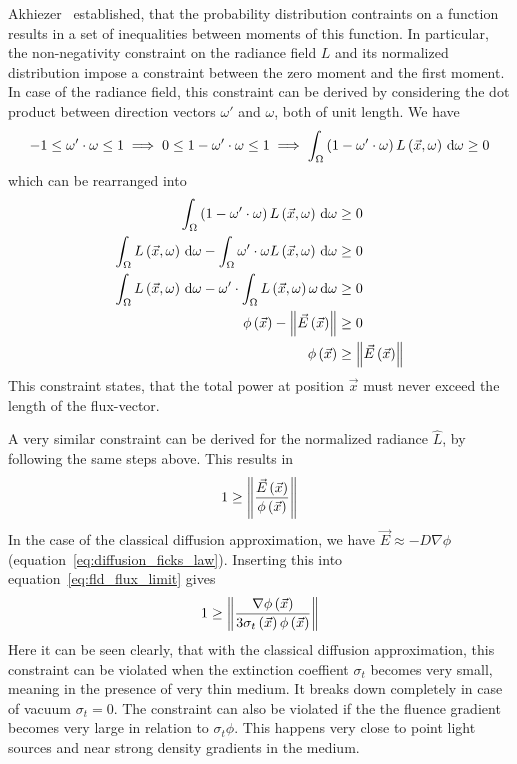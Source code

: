 Akhiezer~\cite{Akhiezer65} established, that the probability distribution contraints on a function results in a set of inequalities between moments of this function. In particular, the non-negativity constraint on the radiance field $L$ and its normalized distribution impose a constraint between the zero moment and the first moment. In case of the radiance field, this constraint can be derived by considering the dot product between direction vectors $\omega'$ and $\omega$, both of unit length. We have
\begin{align*}
-1 \le \omega'\cdot\omega \le 1
\implies
0 \le 1 - \omega'\cdot\omega \le 1
\implies
\int_{\Omega}{\left(1-\omega'\cdot\omega\right)L\left(\vec{x}, \omega\right)\,\mathrm{d}\omega}\ge 0
\end{align*}
which can be rearranged into
\begin{align*}
\int_{\Omega}{\left(1-\omega'\cdot\omega\right)L\left(\vec{x}, \omega\right)\,\mathrm{d}\omega} &\ge 0
\\
\int_{\Omega}{L\left(\vec{x}, \omega\right)\,\mathrm{d}\omega}
-\int_{\Omega}{\omega'\cdot\omega L\left(\vec{x}, \omega\right)\,\mathrm{d}\omega}
&\ge 0
\\
\int_{\Omega}{L\left(\vec{x}, \omega\right)\,\mathrm{d}\omega}
-\omega'\cdot\int_{\Omega}{L\left(\vec{x}, \omega\right)\omega\,\mathrm{d}\omega}
&\ge 0
\\
\phi\left(\vec{x}\right)
-\left\lVert\vec{E}\left(\vec{x}\right)\right\rVert
&\ge 0
\\
\phi\left(\vec{x}\right)
&\ge \left\lVert\vec{E}\left(\vec{x}\right)\right\rVert
\end{align*}
This constraint states, that the total power at position $\vec{x}$ must never exceed the length of the flux-vector.

A very similar constraint can be derived for the normalized radiance $\widehat{L}$, by following the same steps above. This results in
\begin{align}
\label{eq:fld_flux_limit}
1
\ge
\left\lVert
\frac{\vec{E}\left(\vec{x}\right)}{\phi\left(\vec{x}\right)}
\right\rVert
\end{align}
In the case of the classical diffusion approximation, we have $\vec{E}\approx-D\nabla\phi$ (equation~\ref{eq:diffusion_ficks_law}). Inserting this into equation~\ref{eq:fld_flux_limit} gives
\begin{align}
\label{eq:fld_flux_limit}
1
\ge
\left\lVert
\frac{\nabla\phi\left(\vec{x}\right)}{3\sigma_t\left(\vec{x}\right)\phi\left(\vec{x}\right)}
\right\rVert
\end{align}
Here it can be seen clearly, that with the classical diffusion approximation, this constraint can be violated when the extinction coeffient $\sigma_t$ becomes very small, meaning in the presence of very thin medium. It breaks down completely in case of vacuum $\sigma_t=0$. The constraint can also be violated if the the fluence gradient becomes very large in relation to $\sigma_t\phi$. This happens very close to point light sources and near strong density gradients in the medium.

